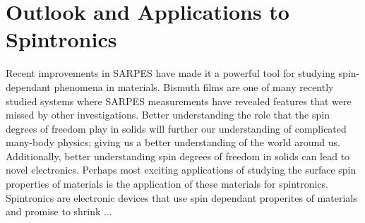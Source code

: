 \documentclass[12pt]{article}
\begin{document}
\section{Outlook and Applications to Spintronics}
Recent improvements in SARPES have made it a powerful tool for studying spin-dependant phenomena in materials.
Bismuth films are one of many recently studied systems where SARPES measurements have revealed features that were missed by other investigations.
Better understanding the role that the spin degrees of freedom play in solids will further our understanding of complicated many-body physics; giving us a better understanding of the world around us.
Additionally, better understanding spin degrees of freedom in solids can lead to novel electronics.
Perhaps most exciting applications of studying the surface spin properties of materials is the application of these materials for spintronics.
Spintronics are electronic devices that use spin dependant properites of materials and promise to shrink ...

\printbibliography
\end{document}
